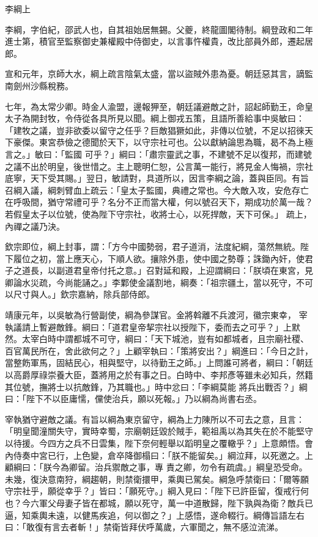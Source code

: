 
\begin{pinyinscope}

 李綱上



 李綱，字伯紀，邵武人也，自其祖始居無錫。父夔，終龍圖閣待制。綱登政和二年進士第，積官至監察御史兼權殿中侍御史，以言事忤權貴，改比部員外郎，遷起居郎。



 宣和元年，京師大水，綱上疏言陰氣太盛，當以盜賊外患為憂。朝廷惡其言，謫監南劍州沙縣稅務。



 七年，為太常少卿。時金人渝盟，邊報狎至，朝廷議避敵之計，詔起師勤王，命皇太子為開封牧，令侍從各具所見以聞。綱上御戎五策，且語所善給事中吳敏曰：「建牧之議，豈非欲委以留守之任乎？巨敵猖獗如此，非傳以位號，不足以招徠天下豪傑。東宮恭儉之德聞於天下，以守宗社可也。公以獻納論思為職，曷不為上極言之。」敏曰：「監國
 可乎？」綱曰：「肅宗靈武之事，不建號不足以復邦，而建號之議不出於明皇，後世惜之。主上聰明仁恕，公言萬一能行，將見金人悔禍，宗社底寧，天下受其賜。」翌日，敏請對，具道所以，因言李綱之論，蓋與臣同。有旨召綱入議，綱刺臂血上疏云：「皇太子監國，典禮之常也。今大敵入攻，安危存亡在呼吸間，猶守常禮可乎？名分不正而當大權，何以號召天下，期成功於萬一哉？若假皇太子以位號，使為陛下守宗社，收將士心，以死捍敵，天下可保。」
 疏上，內禪之議乃決。



 欽宗即位，綱上封事，謂：「方今中國勢弱，君子道消，法度紀綱，蕩然無統。陛下履位之初，當上應天心，下順人欲。攘除外患，使中國之勢尊；誅鋤內奸，使君子之道長，以副道君皇帝付托之意。」召對延和殿，上迎謂綱曰：「朕頃在東宮，見卿論水災疏，今尚能誦之。」李鄴使金議割地，綱奏：「祖宗疆土，當以死守，不可以尺寸與人。」欽宗嘉納，除兵部侍郎。



 靖康元年，以吳敏為行營副使，綱為參謀官。金將斡離不兵渡河，徽宗東幸，
 宰執議請上暫避敵鋒。綱曰：「道君皇帝挈宗社以授陛下，委而去之可乎？」上默然。太宰白時中謂都城不可守，綱曰：「天下城池，豈有如都城者，且宗廟社稷、百官萬民所在，舍此欲何之？」上顧宰執曰：「策將安出？」綱進曰：「今日之計，當整飭軍馬，固結民心，相與堅守，以待勤王之師。」上問誰可將者，綱曰：「朝廷以高爵厚祿崇養大臣，蓋將用之於有事之日。白時中、李邦彥等雖未必知兵，然籍其位號，撫將士以抗敵鋒，乃其職也。」時中忿曰：「李綱莫能
 將兵出戰否？」綱曰：「陛下不以臣庸懦，儻使治兵，願以死報。」乃以綱為尚書右丞。



 宰執猶守避敵之議。有旨以綱為東京留守，綱為上力陳所以不可去之意，且言：「明皇聞潼關失守，實時幸蜀，宗廟朝廷毀於賊手，範祖禹以為其失在於不能堅守以待援。今四方之兵不日雲集，陛下奈何輕舉以蹈明皇之覆轍乎？」上意頗悟。會內侍奏中宮已行，上色變，倉卒降御榻曰：「朕不能留矣。」綱泣拜，以死邀之。上顧綱曰：「朕今為卿留。治兵禦敵之事，專
 責之卿，勿令有疏虞。」綱皇恐受命。未幾，復決意南狩，綱趨朝，則禁衛擐甲，乘輿已駕矣。綱急呼禁衛曰：「爾等願守宗社乎，願從幸乎？」皆曰：「願死守。」綱入見曰：「陛下已許臣留，復戒行何也？今六軍父母妻子皆在都城，願以死守，萬一中道散歸，陛下孰與為衛？敵兵已逼，知乘輿未遠，以健馬疾追，何以御之？」上感悟，遂命輟行。綱傳旨語左右曰：「敢復有言去者斬！」禁衛皆拜伏呼萬歲，六軍聞之，無不感泣流涕。




\end{pinyinscope}
